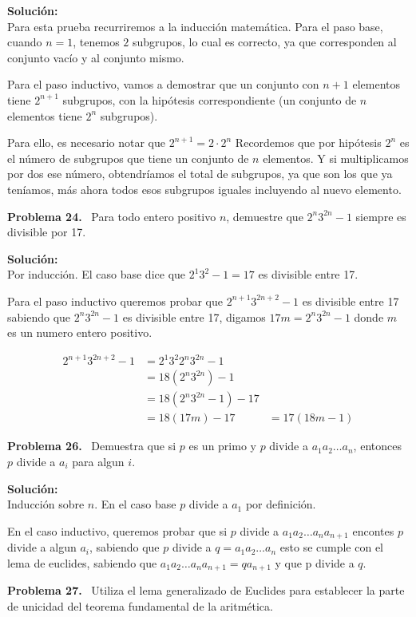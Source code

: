 \documentclass{article}
\newcounter{problem}
\newcounter{solution}
\newcommand\Problem[1]{%
  \stepcounter{problem}%
  \textbf{Problema #1.}~%
  \setcounter{solution}{0}%
}
\newcommand\TheSolution{%
  \textbf{Solución:}\\%
}
\begin{document}
\TheSolution{}
Para esta prueba recurriremos a la inducci\'on matem\'atica. Para el paso base,
cuando $n=1$, tenemos $2$ subgrupos, lo cual es correcto, ya que corresponden
al conjunto vacío y al conjunto mismo.

Para el paso inductivo, vamos a demostrar que un conjunto con $n+1$ elementos
tiene $2^{n+1}$ subgrupos, con la hip\'otesis correspondiente (un conjunto de
$n$ elementos tiene $2^{n}$ subgrupos).

Para ello, es necesario notar que $2^{n+1} = 2\cdot 2^{n}$ Recordemos que por
hipótesis $2^{n}$ es el n\'umero de subgrupos que tiene un conjunto de $n$
elementos. Y si multiplicamos por dos ese número, obtendríamos el total de
subgrupos, ya que son los que ya teníamos, más ahora todos esos subgrupos
iguales incluyendo al nuevo elemento.

\Problem{24} Para todo entero positivo $n$, demuestre que $2^{n} 3^{2n} - 1$
siempre es divisible por 17.

\TheSolution{}
Por inducción. El caso base dice que $2^1 3^2 - 1 = 17$ es divisible entre 17.

Para el paso inductivo queremos probar que $2^{n+1} 3^{2n + 2} - 1$ es
divisible entre 17 sabiendo que $2^{n} 3^{2n} - 1$ es divisible entre 17,
digamos $17m = 2^{n} 3^{2n} - 1$ donde $m$ es un numero entero positivo. 

\[
  \begin{split}
    2^{n+1}3^{2n + 2} - 1 &= 2^1 3^2 2^n 3^{2n} - 1 \\
                          &= 18(2^n 3^{2n}) - 1 \\
                          &= 18(2^n 3^{2n} - 1) - 17 \\
                          &= 18(17m) - 17
                          &= 17(18m - 1)
  \end{split}
\]

\Problem{26} Demuestra que si $p$ es un primo y $p$ divide a $a_1 a_2 \ldots
a_n$, entonces $p$ divide a $a_i$ para algun $i$.

\TheSolution{}
Inducción sobre $n$. En el caso base $p$ divide a $a_1$ por definición.

En el caso inductivo, queremos probar que si $p$ divide a $a_1 a_2 \ldots a_n
a_{n+1}$ encontes $p$ divide a algun $a_i$, sabiendo que $p$ divide a $q = a_1
a_2 \ldots a_n$ esto se cumple con el lema de euclides, sabiendo que $a_1 a_2
\ldots a_n a_{n+1} = q a_{n+1}$ y que p divide a $q$. 

\Problem{27} Utiliza el lema generalizado de Euclides para establecer la parte
de unicidad del teorema fundamental de la aritmética.
\end{document}
